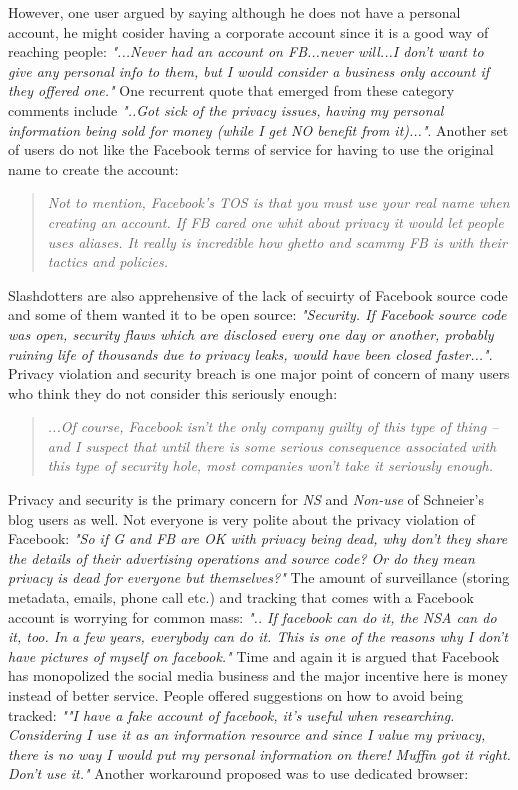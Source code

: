     However, one user argued by saying although he does not have a personal account, he might cosider having a corporate account since it is a good way of reaching people: \textit{"...Never had an account on FB...never will...I don't want to give any personal info to them, but I would consider a business only account if they offered one."} One recurrent quote that emerged from these category comments include \textit{"..Got sick of the privacy issues, having my personal information being sold for money (while I get NO benefit from it)..."}. Another set of users do not like the Facebook terms of service for having to use the original name to create the account: \begin{quote}
         \textit{Not to mention, Facebook's TOS is that you must use your real name when creating an account. If FB cared one whit about privacy it would let people uses aliases. It really is incredible how ghetto and scammy FB is with their tactics and policies. }
         \end{quote} 
    Slashdotters are also apprehensive of the lack of secuirty of Facebook source code and some of them wanted it to be open source: \textit{"Security. If Facebook source code was open, security flaws which are disclosed every one day or another, probably ruining life of thousands due to privacy leaks, would have been closed faster..."}. Privacy violation and security breach is one major point of concern of many users who think they do not consider this seriously enough:
    \begin{quote}
         \textit{...Of course, Facebook isn't the only company guilty of this type of thing -- and I suspect that until there is some serious consequence associated with this type of security hole, most companies won't take it seriously enough.}
    \end{quote}
    
    Privacy and security is the primary concern for \emph{NS} and \emph{Non-use} of Schneier's blog users as well. Not everyone is very polite about the privacy violation of Facebook: \textit{"So if G and FB are OK with privacy being dead, why don't they share the details of their advertising operations and source code? Or do they mean privacy is dead for everyone but themselves?"} The amount of surveillance (storing metadata, emails, phone call etc.) and tracking that comes with a Facebook account is worrying for common mass: \textit{".. If facebook can do it, the NSA can do it, too. In a few years, everybody can do it. This is one of the reasons why I don't have pictures of myself on facebook."} Time and again it is argued that Facebook has monopolized the social media business and the major incentive here is money instead of better service. People offered suggestions on how to avoid being tracked: \textit{""I have a fake account of facebook, it's useful when researching. Considering I use it as an information resource and since I value my privacy, there is no way I would put my personal information on there! Muffin got it right. Don't use it."} Another workaround proposed was to use dedicated browser:

